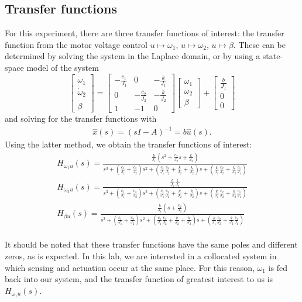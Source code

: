\documentclass[11pt,titlepage]{article}
\begin{document}
	\subsection{Transfer functions}
	For this experiment, there are three transfer functions of interest: the transfer function from the motor voltage control $u\mapsto\omega_1$, $u\mapsto\omega_2$, $u\mapsto\beta$. These can be determined by solving the system in the Laplace domain, or by using a state-space model of the system
	\begin{equation}
		\begin{bmatrix}
			\dot \omega_1\\
			\dot \omega_2\\
			\dot \beta
		\end{bmatrix}=
	  	\begin{bmatrix}
	    		-\frac{c_1}{J_1} & 0 & -\frac{k}{J_1} \\
		    	0 & -\frac{c_2}{J_2} & -\frac{k}{J_2}\\
			1 & -1 & 0
	  	\end{bmatrix}
		\begin{bmatrix}
			\omega_1\\
			\omega_2\\
			\beta
		\end{bmatrix}+
		\begin{bmatrix}
			\frac{b}{J_1}\\
			0\\
			0
		\end{bmatrix}
	\end{equation}
	and solving for the transfer functions with 
	\begin{align}
		\hat{x}(s) = (sI-A)^{-1}=b\hat{u}(s).
	\end{align}
	 Using the latter method, we obtain the transfer functions of interest:\\
	 \begin{align}
	  	H_{\omega_{1}u}(s)= \frac{\frac{b}{J_1}(s^2+\frac{c_2}{J_2}s+\frac{k}{J_2})}{s^3+(\frac{c_1}{J_1}+\frac{c_2}{J_2})s^2+(\frac{c_1}{J_1}\frac{c_2}{J_2}+\frac{k}{J_2}+\frac{k}{J_2})s+(\frac{k}{J_1}\frac{c_2}{J_2}+\frac{k}{J_2}\frac{c_1}{J_1})} \\
	  	H_{\omega_{2}u}(s)= \frac{\frac{b}{J_1}\frac{k}{J_2}}{s^3+(\frac{c_1}{J_1}+\frac{c_2}{J_2})s^2+(\frac{c_1}{J_1}\frac{c_2}{J_2}+\frac{k}{J_2}+\frac{k}{J_2})s+(\frac{k}{J_1}\frac{c_2}{J_2}+\frac{k}{J_2}\frac{c_1}{J_1})}\\
	  	H_{\beta u}(s)=\frac{\frac{b}{J_1}(s+\frac{c_2}{J_2})}{s^3+(\frac{c_1}{J_1}+\frac{c_2}{J_2})s^2+(\frac{c_1}{J_1}\frac{c_2}{J_2}+\frac{k}{J_2}+\frac{k}{J_2})s+(\frac{k}{J_1}\frac{c_2}{J_2}+\frac{k}{J_2}\frac{c_1}{J_1})}
	  \end{align}\\
	  It should be noted that these transfer functions have the same poles and different zeros, as is expected. In this lab, we are interested in a collocated system in which sensing and actuation occur at the same place. For this reason, $\omega_1$ is fed back into our system, and the transfer function of greatest interest to us is $H_{\omega_{1}u}(s)$.
\end{document}
